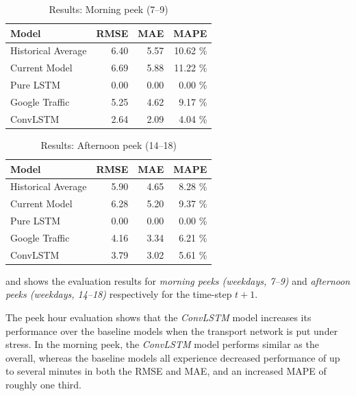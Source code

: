 \documentclass[preprint,11pt,5p,twocolumn]{elsarticle}
\begin{document}
\begin{table}[!ht]
  \center
  \begin{tabular}{l|rrr}
  Model &  RMSE &  MAE &  MAPE \\
  \hline
  \hline
  Historical Average &        6.40 &       5.57 &     10.62 \% \\ \hline
  Current Model      &        6.69 &       5.88 &     11.22 \% \\ \hline
  Pure LSTM          &        0.00 &       0.00 &      0.00 \% \\ \hline
  Google Traffic     &        5.25 &       4.62 &      9.17 \% \\ \hline
  ConvLSTM           &        2.64 &       2.09 &      4.04 \% \\ \hline
  \end{tabular}
  \caption{Results: Morning peek (7--9)}
  \label{tab:morning_peek}
  
\end{table}

\begin{table}[!ht]
  \center
  \begin{tabular}{l|rrr}
  Model &  RMSE &  MAE &  MAPE \\
  \hline
  \hline
  Historical Average &    5.90 &   4.65 &  8.28 \% \\ \hline
  Current Model      &    6.28 &   5.20 &  9.37 \% \\ \hline
  Pure LSTM          &    0.00 &   0.00 &  0.00 \% \\ \hline
  Google Traffic     &    4.16 &   3.34 &  6.21 \% \\ \hline
  ConvLSTM           &    3.79 &   3.02 &  5.61 \% \\ \hline
  \end{tabular}
  \caption{Results: Afternoon peek (14--18)}
  \label{tab:afternoon_peek}  
\end{table}

 and  shows the evaluation results for \emph{morning peeks (weekdays, 7--9)} and \emph{afternoon peeks (weekdays, 14--18)} respectively for the time-step $t + 1$.

The peek hour evaluation shows that the \emph{ConvLSTM} model increases its performance over the baseline models when the transport network is put under stress. In the morning peek, the \emph{ConvLSTM} model performs similar as the overall, whereas the baseline models all experience decreased performance of up to several minutes in both the RMSE and MAE, and an increased MAPE of roughly one third. 
\end{document}
